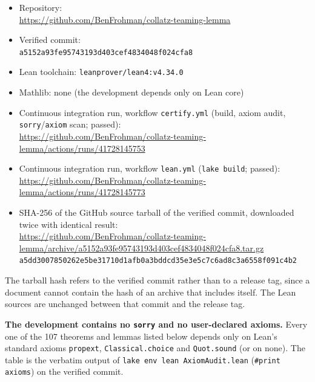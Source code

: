 \documentclass[11pt]{article}
\begin{document}
{\raggedright
\begin{itemize}
\item Repository:\\ {\footnotesize\url{https://github.com/BenFrohman/collatz-teaming-lemma}}
\item Verified commit:\\ {\footnotesize\texttt{a5152a93fe95743193d403cef4834048f024cfa8}}
\item Lean toolchain: \texttt{leanprover/lean4:v4.34.0}
\item Mathlib: none (the development depends only on Lean core)
\item Continuous integration run, workflow \texttt{certify.yml} (build, axiom audit, \texttt{sorry}/\texttt{axiom} scan; passed):\\ {\footnotesize\url{https://github.com/BenFrohman/collatz-teaming-lemma/actions/runs/41728145753}}
\item Continuous integration run, workflow \texttt{lean.yml} (\texttt{lake build}; passed):\\ {\footnotesize\url{https://github.com/BenFrohman/collatz-teaming-lemma/actions/runs/41728145773}}
\item SHA-256 of the GitHub source tarball of the verified commit, downloaded twice with identical result:\\ {\footnotesize\url{https://github.com/BenFrohman/collatz-teaming-lemma/archive/a5152a93fe95743193d403cef4834048f024cfa8.tar.gz}}\\
{\footnotesize\texttt{a5dd3007850262e5be31710d1afb0a3bddcd35e3e5c7c6ad8c3a6558f091c4b2}}
\end{itemize}\par}

The tarball hash refers to the verified commit rather than to a release tag, since a document cannot contain the hash of an archive that includes itself. The Lean sources are unchanged between that commit and the release tag.

\textbf{The development contains no \texttt{sorry} and no user-declared axioms.} Every one of the 107 theorems and lemmas listed below depends only on Lean's standard axioms \texttt{propext}, \texttt{Classical.choice} and \texttt{Quot.sound} (or on none). The table is the verbatim output of \texttt{lake env lean AxiomAudit.lean} (\texttt{\#print axioms}) on the verified commit.
\end{document}
